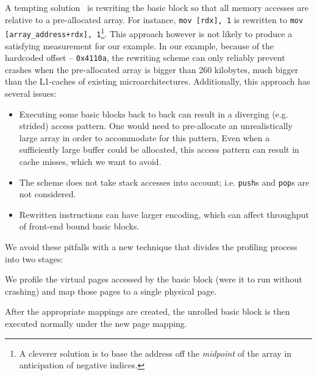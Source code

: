 A tempting solution~\cite{ithemal} is rewriting
the basic block so that all memory accesses are
relative to a pre-allocated array.
For instance, \verb|mov [rdx], 1| is rewritten to
\verb|mov [array_address+rdx], 1|\footnote{
A cleverer solution is to
base the address off the \textit{midpoint} of the array
in anticipation of negative indices.
}. 
This approach however is not likely to produce a satisfying measurement
for our example.
In our example,
because of the hardcoded offset -- \verb|0x4110a|,
the rewriting scheme can only reliably prevent crashes when the pre-allocated array
is bigger than 260 kilobytes, much bigger than the L1-caches of existing microarchitectures.
Additionally, this approach has several issues:
\begin{itemize}
    \item Executing some basic blocks back to back can result in a 
    diverging (e.g. strided) access pattern. 
    One would need to pre-allocate an unrealistically large array
    in order to  accommodate for this pattern, 
    Even when a sufficiently large buffer could be allocated,
    this access pattern can result in cache misses, 
    which we want to avoid.
    \item The scheme does not take stack accesses into account; i.e. \verb|push|s and \verb|pop|s
    are not considered.
    \item Rewritten instructions can
    have larger encoding, which can affect throughput
    of front-end bound basic blocks.
\end{itemize}

We avoid these pitfalls with a new technique
that divides the profiling process into two stages:
\begin{enumerate*}
\item We profile the virtual pages accessed by
the basic block (were it to run without crashing)
and map those pages to a single physical page.
\item After the appropriate mappings are created,
the unrolled basic block is then executed normally under
the new page mapping.
\end{enumerate*}

